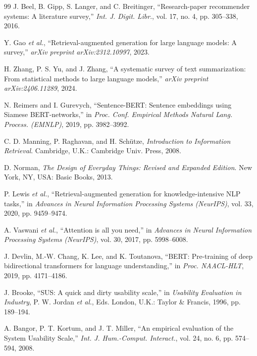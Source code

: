 \documentclass[conference]{IEEEtran}
\begin{document}
\begin{thebibliography}{99}
J. Beel, B. Gipp, S. Langer, and C. Breitinger, ``Research-paper recommender systems: A literature survey,'' \textit{Int. J. Digit. Libr.}, vol. 17, no. 4, pp. 305--338, 2016.

Y. Gao \textit{et al.}, ``Retrieval-augmented generation for large language models: A survey,'' \textit{arXiv preprint arXiv:2312.10997}, 2023.

H. Zhang, P. S. Yu, and J. Zhang, ``A systematic survey of text summarization: From statistical methods to large language models,'' \textit{arXiv preprint arXiv:2406.11289}, 2024.

N. Reimers and I. Gurevych, ``Sentence-BERT: Sentence embeddings using Siamese BERT-networks,'' in \textit{Proc. Conf. Empirical Methods Natural Lang. Process. (EMNLP)}, 2019, pp. 3982--3992.

C. D. Manning, P. Raghavan, and H. Sch\"utze, \textit{Introduction to Information Retrieval}. Cambridge, U.K.: Cambridge Univ. Press, 2008.

D. Norman, \textit{The Design of Everyday Things: Revised and Expanded Edition}. New York, NY, USA: Basic Books, 2013.

P. Lewis \textit{et al.}, ``Retrieval-augmented generation for knowledge-intensive NLP tasks,'' in \textit{Advances in Neural Information Processing Systems (NeurIPS)}, vol. 33, 2020, pp. 9459--9474.

A. Vaswani \textit{et al.}, ``Attention is all you need,'' in \textit{Advances in Neural Information Processing Systems (NeurIPS)}, vol. 30, 2017, pp. 5998--6008.

J. Devlin, M.-W. Chang, K. Lee, and K. Toutanova, ``BERT: Pre-training of deep bidirectional transformers for language understanding,'' in \textit{Proc. NAACL-HLT}, 2019, pp. 4171--4186.

J. Brooke, ``SUS: A quick and dirty usability scale,'' in \textit{Usability Evaluation in Industry}, P. W. Jordan \textit{et al.}, Eds. London, U.K.: Taylor \& Francis, 1996, pp. 189--194.

A. Bangor, P. T. Kortum, and J. T. Miller, ``An empirical evaluation of the System Usability Scale,'' \textit{Int. J. Hum.-Comput. Interact.}, vol. 24, no. 6, pp. 574--594, 2008.


\end{thebibliography}
\end{document}
